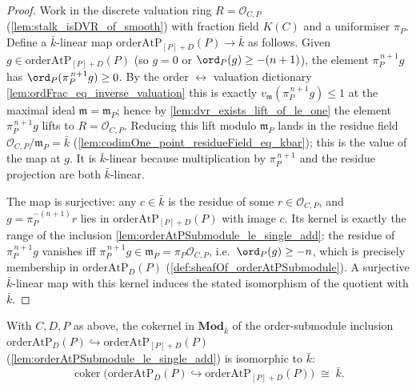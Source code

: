 \begin{proof}
  Work in the discrete valuation ring \(R = \mathcal O_{C,P}\)
  (\cref{lem:stalk_isDVR_of_smooth}) with fraction field \(K(C)\) and a
  uniformiser \(\pi_P\). Define a \(\bar k\)-linear map
  \(\mathrm{orderAtP}_{[P]+D}(P) \to \bar k\) as follows. Given
  \(g \in \mathrm{orderAtP}_{[P]+D}(P)\) (so \(g = 0\) or
  \(\ord_P(g) \ge -(n+1)\)), the element \(\pi_P^{\,n+1} g\) has
  \(\ord_P(\pi_P^{\,n+1} g) \ge 0\). By the order \(\leftrightarrow\) valuation
  dictionary \cref{lem:ordFrac_eq_inverse_valuation} this is exactly
  \(v_{\mathfrak m}(\pi_P^{\,n+1} g) \le 1\) at the maximal ideal
  \(\mathfrak m = \mathfrak m_P\); hence by
  \cref{lem:dvr_exists_lift_of_le_one} the element \(\pi_P^{\,n+1} g\) lifts to
  \(R = \mathcal O_{C,P}\). Reducing this lift modulo \(\mathfrak m_P\) lands in
  the residue field \(\mathcal O_{C,P}/\mathfrak m_P = \bar k\)
  (\cref{lem:codimOne_point_residueField_eq_kbar}); this is the value of the
  map at \(g\). It is \(\bar k\)-linear because multiplication by
  \(\pi_P^{\,n+1}\) and the residue projection are both \(\bar k\)-linear.

  The map is surjective: any \(c \in \bar k\) is the residue of some
  \(r \in \mathcal O_{C,P}\), and \(g = \pi_P^{-(n+1)} r\) lies in
  \(\mathrm{orderAtP}_{[P]+D}(P)\) with image \(c\). Its kernel is exactly the
  range of the inclusion \cref{lem:orderAtPSubmodule_le_single_add}: the residue
  of \(\pi_P^{\,n+1} g\) vanishes iff \(\pi_P^{\,n+1} g \in \mathfrak m_P =
  \pi_P\mathcal O_{C,P}\), i.e.\ \(\ord_P(g) \ge -n\), which is precisely
  membership in \(\mathrm{orderAtP}_D(P)\) (\cref{def:sheafOf_orderAtPSubmodule}).
  A surjective \(\bar k\)-linear map with this kernel induces the stated
  isomorphism of the quotient with \(\bar k\).
\end{proof}

\begin{lemma}
  \label{lem:orderAtP_quotient_iso_kbar}
  With \(C, D, P\) as above, the cokernel in \(\mathbf{Mod}_{\bar k}\) of the
  order-submodule inclusion
  \(\mathrm{orderAtP}_D(P) \hookrightarrow \mathrm{orderAtP}_{[P]+D}(P)\)
  (\cref{lem:orderAtPSubmodule_le_single_add}) is isomorphic to \(\bar k\):
  \[
    \operatorname{coker}\!\bigl(
      \mathrm{orderAtP}_D(P) \hookrightarrow
      \mathrm{orderAtP}_{[P]+D}(P)\bigr)
    \;\cong\; \bar k.
  \]
\end{lemma}

